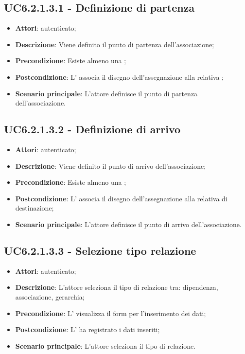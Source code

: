 \subsection{UC6.2.1.3.1 - Definizione  di partenza}
\label{ssec:UC6.2.1.3.1}
\begin{itemize}
\item \textbf{Attori}:  autenticato;
\item \textbf{Descrizione}: Viene definito il punto di partenza dell'associazione;
\item \textbf{Precondizione}: Esiste almeno una ;
\item \textbf{Postcondizione}: L' associa il disegno dell'assegnazione alla relativa ;
\item \textbf{Scenario principale}: L'attore definisce il punto di partenza dell'associazione.
\end{itemize}
\subsection{UC6.2.1.3.2 - Definizione  di arrivo}
\label{ssec:UC6.2.1.3.2}
\begin{itemize}
\item \textbf{Attori}:  autenticato;
\item \textbf{Descrizione}: Viene definito il punto di arrivo dell'associazione;
\item \textbf{Precondizione}: Esiste almeno una ;
\item \textbf{Postcondizione}: L' associa il disegno dell'assegnazione alla relativa  di destinazione;
\item \textbf{Scenario principale}: L'attore definisce il punto di arrivo dell'associazione.
\end{itemize}
\subsection{UC6.2.1.3.3 - Selezione tipo relazione}
\label{ssec:UC6.2.1.3.3}
\begin{itemize}
\item \textbf{Attori}:  autenticato;
\item \textbf{Descrizione}: L'attore seleziona il tipo di relazione tra: dipendenza, associazione, gerarchia;
\item \textbf{Precondizione}: L' visualizza il form per l'inserimento dei dati;
\item \textbf{Postcondizione}: L' ha registrato i dati inseriti;
\item \textbf{Scenario principale}: L'attore seleziona il tipo di relazione.
\end{itemize}
